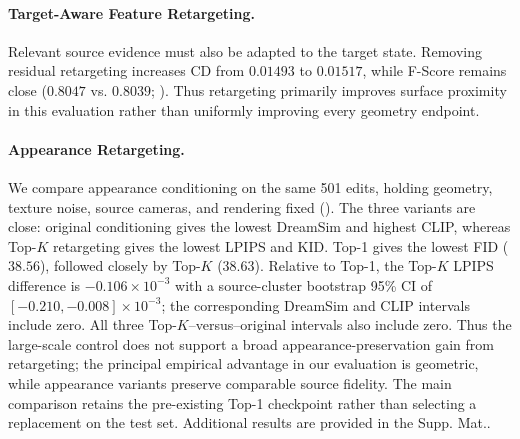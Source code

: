{\paragraph{Target-Aware Feature Retargeting.}
%
Relevant source evidence must also be adapted to the target state.
%
Removing residual retargeting increases CD from $0.01493$ to $0.01517$, while F-Score remains close ($0.8047$ vs. $0.8039$; ).
Thus retargeting primarily improves surface proximity in this evaluation rather than uniformly improving every geometry endpoint.

\paragraph{Appearance Retargeting.}
%
We compare appearance conditioning on the same 501 edits, holding geometry,
texture noise, source cameras, and rendering fixed
().  The three variants are close: original
conditioning gives the lowest DreamSim and highest CLIP, whereas Top-$K$
retargeting gives the lowest LPIPS and KID.  Top-1 gives the lowest FID
($38.56$), followed closely by Top-$K$ ($38.63$).  Relative to Top-1, the Top-$K$ LPIPS
difference is $-0.106\!\times\!10^{-3}$ with a source-cluster bootstrap 95\%
CI of $[-0.210,-0.008]\!\times\!10^{-3}$; the corresponding DreamSim and
CLIP intervals include zero.  All three Top-$K$--versus--original intervals
also include zero.  Thus the large-scale control does not support a broad
appearance-preservation gain from retargeting; the principal empirical
advantage in our evaluation is geometric, while appearance variants preserve comparable
source fidelity.  The main comparison retains the pre-existing Top-1
checkpoint rather than selecting a replacement on the test set.
%
Additional results are provided in the Supp. Mat..

}
